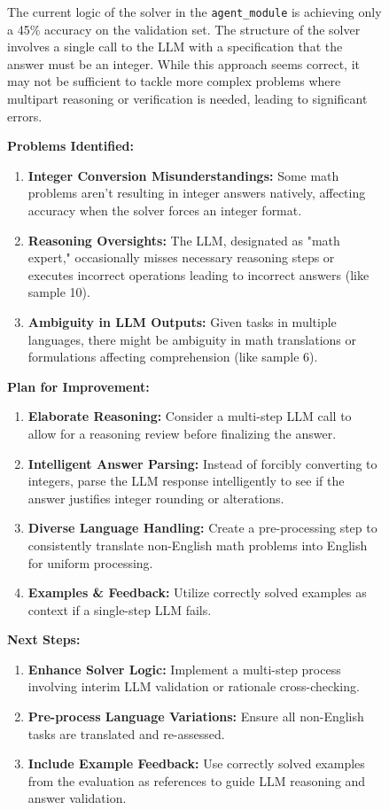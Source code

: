 \documentclass[11pt]{article}
\newcommand{\framework}{Gödel Agent\xspace}
\begin{document}
\newpage
\begin{figure}[ht]
\begin{tcolorbox}[colback=black!15!white, colframe=black, title=Analysis Example of \framework]
\small
The current logic of the solver in the \texttt{agent\_module} is achieving only a 45\% accuracy on the validation set. The structure of the solver involves a single call to the LLM with a specification that the answer must be an integer. While this approach seems correct, it may not be sufficient to tackle more complex problems where multipart reasoning or verification is needed, leading to significant errors.

\textbf{Problems Identified:}
\begin{enumerate}
    \item \textbf{Integer Conversion Misunderstandings:} Some math problems aren't resulting in integer answers natively, affecting accuracy when the solver forces an integer format.
    \item \textbf{Reasoning Oversights:} The LLM, designated as "math expert," occasionally misses necessary reasoning steps or executes incorrect operations leading to incorrect answers (like sample 10).
    \item \textbf{Ambiguity in LLM Outputs:} Given tasks in multiple languages, there might be ambiguity in math translations or formulations affecting comprehension (like sample 6).
\end{enumerate}

\textbf{Plan for Improvement:}
\begin{enumerate}
    \item \textbf{Elaborate Reasoning:} Consider a multi-step LLM call to allow for a reasoning review before finalizing the answer.
    \item \textbf{Intelligent Answer Parsing:} Instead of forcibly converting to integers, parse the LLM response intelligently to see if the answer justifies integer rounding or alterations.
    \item \textbf{Diverse Language Handling:} Create a pre-processing step to consistently translate non-English math problems into English for uniform processing.
    \item \textbf{Examples \& Feedback:} Utilize correctly solved examples as context if a single-step LLM fails.
\end{enumerate}

\textbf{Next Steps:}
\begin{enumerate}
    \item \textbf{Enhance Solver Logic:} Implement a multi-step process involving interim LLM validation or rationale cross-checking.
    \item \textbf{Pre-process Language Variations:} Ensure all non-English tasks are translated and re-assessed.
    \item \textbf{Include Example Feedback:} Use correctly solved examples from the evaluation as references to guide LLM reasoning and answer validation.
\end{enumerate}


\end{tcolorbox}
\end{figure}
\end{document}
